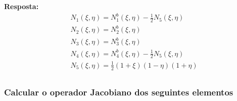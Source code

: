 \color{blue}
\textbf{Resposta:}
\begin{equation}
	\begin{split}
		&N_1(\xi,\eta) = N^b_1(\xi,\eta) - \frac{1}{2}  N_5(\xi,\eta)\\
		&N_2(\xi,\eta) = N^b_2(\xi,\eta)\\
		&N_3(\xi,\eta) = N^b_3(\xi,\eta)\\
		&N_4(\xi,\eta) = N^b_4(\xi,\eta) - \frac{1}{2}  N_5(\xi,\eta)\\
		&N_5(\xi,\eta) = \frac{1}{2}(1+\xi)(1-\eta)(1+\eta)\\
	\end{split}
\end{equation}
\color{black}

\subsubsection{Calcular o operador Jacobiano dos seguintes elementos}

